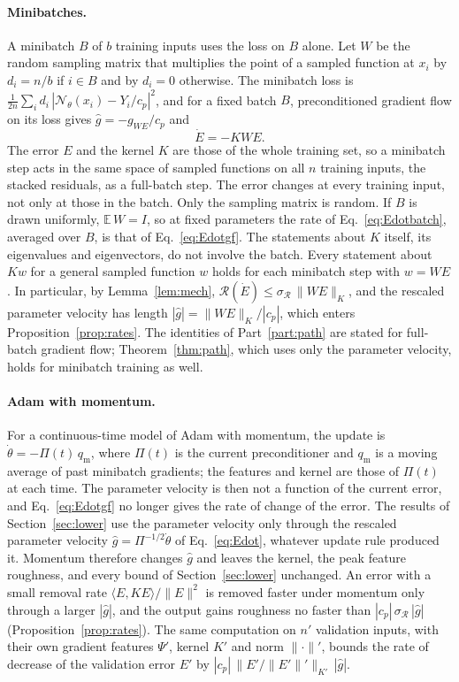 \documentclass[11pt]{article}
\theoremstyle{definition}
\theoremstyle{remark}
\newcommand{\Net}{\mathcal{N}_\theta}    %
\newcommand{\Rgh}{\mathcal{R}}           %
\newcommand{\sR}{\sigma_{\Rgh}}
\newcommand{\ip}[2]{\langle #1,#2\rangle}
\begin{document}
\paragraph{Minibatches.}
A minibatch $B$ of $b$ training inputs uses the loss on $B$ alone.
Let $W$ be the random sampling matrix that multiplies the point of a sampled function at $x_i$ by $d_i = n/b$ if $i \in B$ and by $d_i = 0$ otherwise.
The minibatch loss is $\tfrac1{2n}\sum_i d_i\,|\Net(x_i) - Y_i/c_p|^2$, and for a fixed batch $B$, preconditioned gradient flow on its loss gives $\hat g = -g_{WE}/c_p$ and
\begin{equation}\label{eq:Edotbatch}
\dot E = -K W E .
\end{equation}
The error $E$ and the kernel $K$ are those of the whole training set, so a minibatch step acts in the same space of sampled functions on all $n$ training inputs, the stacked residuals, as a full-batch step.
The error changes at every training input, not only at those in the batch.
Only the sampling matrix is random.
If $B$ is drawn uniformly, $\mathbb{E}\,W = I$, so at fixed parameters the rate of Eq.~\eqref{eq:Edotbatch}, averaged over $B$, is that of Eq.~\eqref{eq:Edotgf}.
The statements about $K$ itself, its eigenvalues and eigenvectors, do not involve the batch.
Every statement about $Kw$ for a general sampled function $w$ holds for each minibatch step with $w = WE$.
In particular, by Lemma~\ref{lem:mech}, $\Rgh(\dot E) \le \sR\,\|WE\|_K$, and the rescaled parameter velocity has length $|\hat g| = \|WE\|_K/|c_p|$, which enters Proposition~\ref{prop:rates}.
The identities of Part~\ref{part:path} are stated for full-batch gradient flow; Theorem~\ref{thm:path}, which uses only the parameter velocity, holds for minibatch training as well.

\paragraph{Adam with momentum.}
For a continuous-time model of Adam with momentum, the update is $\dot\theta = -\Pi(t)\,q_{\mathrm m}$, where $\Pi(t)$ is the current preconditioner and $q_{\mathrm m}$ is a moving average of past minibatch gradients; the features and kernel are those of $\Pi(t)$ at each time.
The parameter velocity is then not a function of the current error, and Eq.~\eqref{eq:Edotgf} no longer gives the rate of change of the error.
The results of Section~\ref{sec:lower} use the parameter velocity only through the rescaled parameter velocity $\hat g = \Pi^{-1/2}\dot\theta$ of Eq.~\eqref{eq:Edot}, whatever update rule produced it.
Momentum therefore changes $\hat g$ and leaves the kernel, the peak feature roughness, and every bound of Section~\ref{sec:lower} unchanged.
An error with a small removal rate $\ip{E}{KE}/\|E\|^2$ is removed faster under momentum only through a larger $|\hat g|$, and the output gains roughness no faster than $|c_p|\,\sR\,|\hat g|$ (Proposition~\ref{prop:rates}).
The same computation on $n'$ validation inputs, with their own gradient features $\Psi'$, kernel $K'$ and norm $\|\cdot\|'$, bounds the rate of decrease of the validation error $E'$ by $|c_p|\,\|E'/\|E'\|'\|_{K'}\,|\hat g|$.
\end{document}
